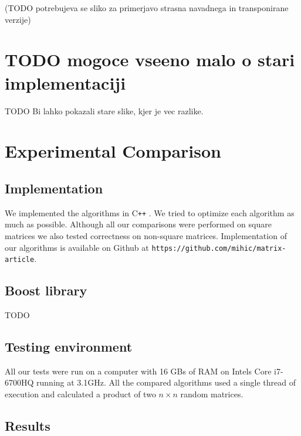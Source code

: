 \documentclass[a4paper,11pt]{article}
\newcommand{\cpp}{C\texttt{++} }
\begin{document}
(TODO potrebujeva se sliko za primerjavo strasna navadnega in transponirane verzije)

\section{TODO mogoce vseeno malo o stari implementaciji}
TODO Bi lahko pokazali stare slike, kjer je vec razlike.

\section{Experimental Comparison}

\subsection{Implementation}
We implemented the algorithms in \cpp. We tried to optimize each algorithm as much as possible. Although all our comparisons were performed on square matrices we also tested correctness on non-square matrices. Implementation of our algorithms is available on Github at \texttt{https://github.com/mihic/matrix-article}.





\subsection{Boost library}
TODO

\subsection{Testing environment}
All our tests were run on a computer with 16 GBs of RAM on Intels Core i7-6700HQ running at 3.1GHz. All the compared algorithms used a single thread of execution and calculated a product of two $n \times n$ random matrices. 



\subsection{Results}
\end{document}
